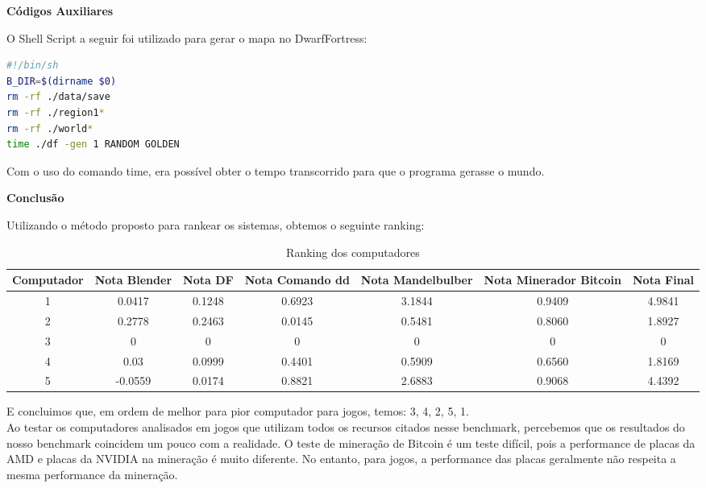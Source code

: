\documentclass[10pt,a4paper]{report}
\begin{document}
\begin{Large}
\textbf{Códigos Auxiliares}
\newline
\end{Large}

O Shell Script a seguir foi utilizado para gerar o mapa no DwarfFortress:\\

\begin{lstlisting}[language=sh]
#!/bin/sh
B_DIR=$(dirname $0)
rm -rf ./data/save
rm -rf ./region1*
rm -rf ./world*
time ./df -gen 1 RANDOM GOLDEN
\end{lstlisting}

Com o uso do comando time, era possível obter o tempo transcorrido para que o programa gerasse o mundo.
\newline
\newline

\begin{Large}
\textbf{Conclusão}
\newline
\end{Large}

Utilizando o método proposto para rankear os sistemas, obtemos o seguinte ranking:

\begin{samepage}
\begin{table}[H]\small
\caption{Ranking dos computadores}
\begin{center}
\begin{tabular}{|c|c|c|c|c|c|c|}
\hline 
Computador & Nota Blender & Nota DF & Nota Comando dd & Nota Mandelbulber & Nota Minerador Bitcoin & Nota Final\\ 
\hline
1 & 0.0417 & 0.1248 & 0.6923 & 3.1844 & 0.9409 & 4.9841\\
\hline
2 & 0.2778 & 0.2463 & 0.0145 & 0.5481 & 0.8060 & 1.8927\\
\hline
3 & 0 & 0 & 0 & 0 & 0 & 0\\
\hline
4 & 0.03 & 0.0999 & 0.4401 & 0.5909 & 0.6560 & 1.8169\\
\hline
5 & -0.0559 & 0.0174 & 0.8821 & 2.6883 & 0.9068 & 4.4392\\
\hline
\end{tabular} 
\end{center}
\end{table}
\end{samepage}

E concluimos que, em ordem de melhor para pior computador para jogos, temos: 3, 4, 2, 5, 1.\\

Ao testar os computadores analisados em jogos que utilizam todos os recursos citados nesse benchmark, percebemos que os resultados do nosso benchmark coincidem um pouco com a realidade. O teste de mineração de Bitcoin é um teste difícil, pois a performance de placas da AMD e placas da NVIDIA na mineração é muito diferente. No entanto, para jogos, a performance das placas geralmente não respeita a mesma performance da mineração.
\end{document}
